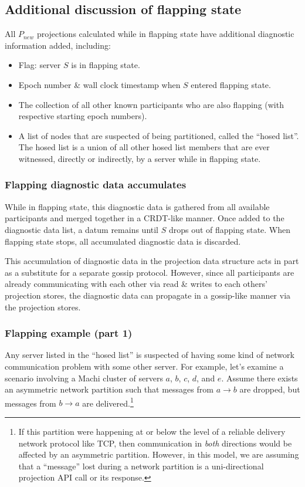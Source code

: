 \documentclass[preprint,10pt]{sigplanconf}
\begin{document}
\subsection{Additional discussion of flapping state}
\label{sub:flapping-state}
All $P_{new}$ projections
calculated while in flapping state have additional diagnostic
information added, including:

\begin{itemize}
\item Flag: server $S$ is in flapping state.
\item Epoch number \& wall clock timestamp when $S$ entered flapping state.
\item The collection of all other known participants who are also
  flapping (with respective starting epoch numbers).
\item A list of nodes that are suspected of being partitioned, called the
  ``hosed list''.  The hosed list is a union of all other hosed list
  members that are ever witnessed, directly or indirectly, by a server
  while in flapping state.
\end{itemize}

\subsubsection{Flapping diagnostic data accumulates}

While in flapping state, this diagnostic data is gathered from
all available participants and merged together in a CRDT-like manner.
Once added to the diagnostic data list, a datum remains until
$S$ drops out of flapping state.  When flapping state stops, all
accumulated diagnostic data is discarded.

This accumulation of diagnostic data in the projection data
structure acts in part as a substitute for a separate gossip protocol.
However, since all participants are already communicating with each
other via read \& writes to each others' projection stores, the diagnostic
data can propagate in a gossip-like manner via the projection stores.

\subsubsection{Flapping example (part 1)}
\label{ssec:flapping-example}

Any server listed in the ``hosed list'' is suspected of having some
kind of network communication problem with some other server.  For
example, let's examine a scenario involving a Machi cluster of servers
$a$, $b$, $c$, $d$, and $e$.  Assume there exists an asymmetric network
partition such that messages from $a \rightarrow b$ are dropped, but
messages from $b \rightarrow a$ are delivered.\footnote{If this
  partition were happening at or below the level of a reliable
  delivery network protocol like TCP, then communication in {\em both}
  directions would be affected by an asymmetric partition.
  However, in this model, we are
  assuming that a ``message'' lost during a network partition is a
  uni-directional projection API call or its response.}
\end{document}
